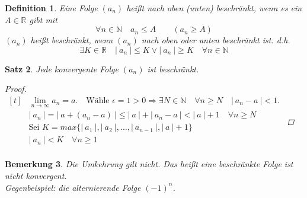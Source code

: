 \documentclass[a4paper,titlepage,oneside]{article}
\def\N{\ensuremath{\mathbb{N}} }
\def\R{\ensuremath{\mathbb{R}} }
\def\lor{\ensuremath{\vee}}
\renewcommand{\liminf}[2][n]{\ensuremath{\lim\limits_{#1 \rightarrow \infty}{#2}}}
\newcommand{\abs}[1]{\ensuremath{\left|\:#1\:\right|}}
\theoremstyle{thmstyle}
\newtheorem{satz}{Satz}[subsection]
\newtheorem{defi}[satz]{Definition}
\newtheorem{bem}[satz]{Bemerkung}
\begin{document}
\begin{defi}
Eine Folge \((a_n)\) heißt nach oben (unten) beschränkt, wenn es ein \(A \in \R\) gibt mit \[\forall n \in \N \quad a_n \le A \qquad (a_n \ge A)\]
\((a_n)\) heißt beschränkt, wenn \((a_n)\) nach oben oder unten beschränkt ist. d.h. \[\exists K \in \R \quad \abs{a_n} \le K \lor \abs{a_n} \ge K \quad \forall n \in \N \]
\end{defi}

\begin{satz}
Jede konvergente Folge \((a_n)\) ist beschränkt.
\begin{proof}
\begin{math} \displaystyle
\begin{aligned}[t]
	&\liminf{a_n} = a. \quad \text{Wähle } \epsilon = 1 > 0 \Rightarrow \exists N \in \N \quad \forall n \ge N \quad \abs{a_n - a} < 1. \\
	&\abs{a_n} = \abs{a + (a_n - a)} \le \abs{a} + \abs{a_n- a} < \abs{a} + 1 \quad \forall n \ge N \\
	&\text{Sei } K = max\{\abs{a_1}, \abs{a_2}, \dots, \abs{a_{n-1}}, \abs{a}+1\} \\
	&\abs{a_n} < K \quad \forall n \ge 1 \\
\end{aligned}
\end{math}
\end{proof}
\end{satz}

\begin{bem}
Die Umkehrung gilt nicht. Das heißt eine beschränkte Folge ist nicht konvergent.\\
\textit{Gegenbeispiel}: die alternierende Folge $(-1)^n$.
\end{bem}
\end{document}
